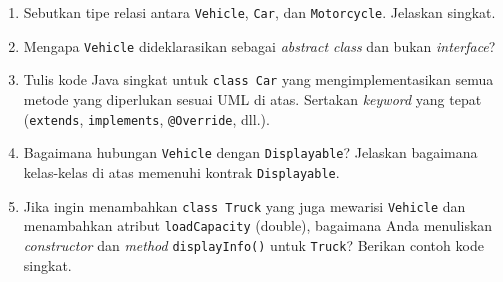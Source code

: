 \documentclass[10pt,openany,a4paper]{article}
\begin{document}
\begin{enumerate}
    \begin{enumerate}[label=(\alph*)]
        \item Sebutkan tipe relasi antara \texttt{Vehicle}, \texttt{Car}, dan \texttt{Motorcycle}. Jelaskan singkat.\vspace{2mm}
        \item Mengapa \texttt{Vehicle} dideklarasikan sebagai \textit{abstract class} dan bukan \textit{interface}?\vspace{2mm}
        \item Tulis kode Java singkat untuk \texttt{class Car} yang mengimplementasikan semua metode yang diperlukan sesuai UML di atas. Sertakan \textit{keyword} yang tepat (\texttt{extends}, \texttt{implements}, \texttt{@Override}, dll.).\vspace{2mm}
        \item Bagaimana hubungan \texttt{Vehicle} dengan \texttt{Displayable}? Jelaskan bagaimana kelas-kelas di atas memenuhi kontrak \texttt{Displayable}.\vspace{2mm}
        \item Jika ingin menambahkan \texttt{class Truck} yang juga mewarisi \texttt{Vehicle} dan menambahkan atribut \texttt{loadCapacity} (double), bagaimana Anda menuliskan \textit{constructor} dan \textit{method} \texttt{displayInfo()} untuk \texttt{Truck}? Berikan contoh kode singkat.\vspace{2mm}
    \end{enumerate}
\end{enumerate}
\end{document}
